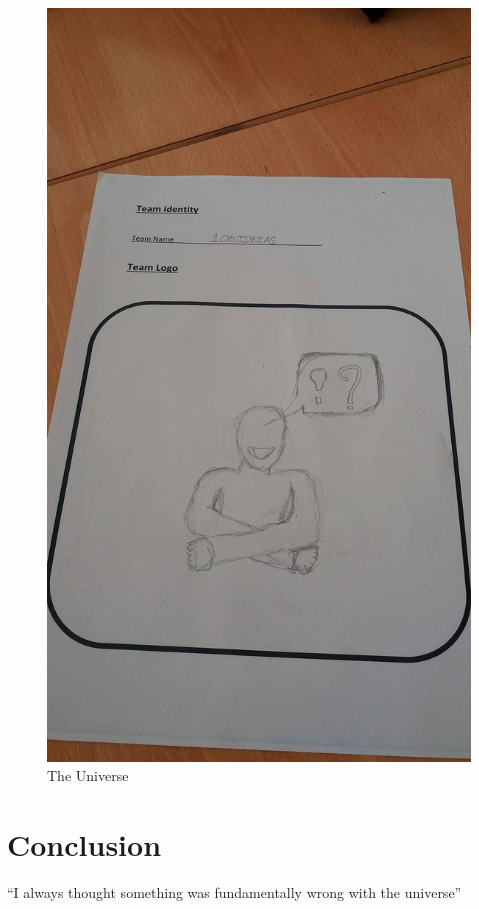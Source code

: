 \documentclass{article}
\begin{document}
\begin{figure}[h!]
\centering
\includegraphics[scale=1.7]{logo.jpg}
\caption{The Universe}
\label{fig:univerise}
\end{figure}

\section{Conclusion}
``I always thought something was fundamentally wrong with the universe'' \citep{adams1995hitchhiker}



\end{document}
